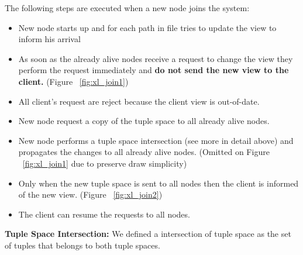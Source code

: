 \documentclass[times, 10pt,twocolumn]{article}
\begin{document}



The following steps are executed when a new node joins the system:
\begin{itemize}
   \item New node starts up and for each path in file tries to update the view to inform his arrival
   \item As soon as the already alive nodes receive a request to change the view they perform the request
   immediately and \textbf{do not send the new view to the client.} (Figure ~\ref{fig:xl_join1})
   \item All client's request are reject because the client view is out-of-date.
   \item New node request a copy of the tuple space to all already alive nodes.
   \item New node performs a tuple space intersection (see more in detail above) and propagates the changes
   to all already alive nodes. (Omitted on Figure ~\ref{fig:xl_join1} due to preserve draw simplicity)
   \item Only when the new tuple space is sent to all nodes then the client is informed of the new view. (Figure ~\ref{fig:xl_join2})
   \item The client can resume the requests to all nodes.   
\end{itemize}

\textbf{Tuple Space Intersection:} We defined a intersection of tuple space as the set of tuples
that belongs to both tuple spaces.
\end{document}
